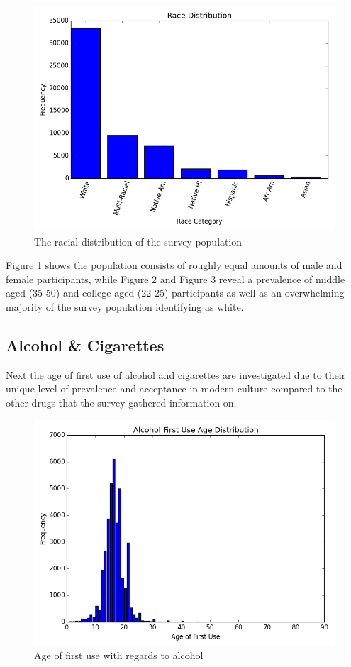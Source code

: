 \documentclass[a4 paper]{article}
\begin{document}
\begin{figure}[H]
	\centering
	\includegraphics[width=5in]{images/raceDist}
	\caption{The racial distribution of the survey population}
\end{figure}

Figure 1 shows the population consists of roughly equal amounts of male and female participants, while Figure 2 and Figure 3 reveal a prevalence of middle aged (35-50) and college aged (22-25) participants as well as an overwhelming majority of the survey population identifying as white. \\


\subsection*{Alcohol \& Cigarettes}
Next the age of first use of alcohol and cigarettes are investigated due to their unique level of prevalence and acceptance in modern culture compared to the other drugs that the survey gathered information on.

\begin{figure}[H]
	\centering
	\includegraphics[width=5in]{images/alcAFU}
	\caption{Age of first use with regards to alcohol}
\end{figure}
\end{document}
